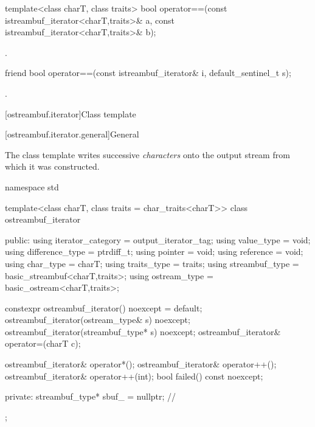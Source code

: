 %
\begin{itemdecl}
template<class charT, class traits>
  bool operator==(const istreambuf_iterator<charT,traits>& a,
                  const istreambuf_iterator<charT,traits>& b);
\end{itemdecl}

\begin{itemdescr}
\pnum
\returns
{}.
\end{itemdescr}

%
\begin{itemdecl}
friend bool operator==(const istreambuf_iterator& i, default_sentinel_t s);
\end{itemdecl}

\begin{itemdescr}
\pnum
\returns
{}.
\end{itemdescr}

[ostreambuf.iterator]{Class template }

[ostreambuf.iterator.general]{General}

\pnum
The class template 
writes successive \textit{characters} onto the output stream
from which it was constructed.

%
\begin{codeblock}
namespace std {
  template<class charT, class traits = char_traits<charT>>
  class ostreambuf_iterator {
  public:
    using iterator_category = output_iterator_tag;
    using value_type        = void;
    using difference_type   = ptrdiff_t;
    using pointer           = void;
    using reference         = void;
    using char_type         = charT;
    using traits_type       = traits;
    using streambuf_type    = basic_streambuf<charT,traits>;
    using ostream_type      = basic_ostream<charT,traits>;

    constexpr ostreambuf_iterator() noexcept = default;
    ostreambuf_iterator(ostream_type& s) noexcept;
    ostreambuf_iterator(streambuf_type* s) noexcept;
    ostreambuf_iterator& operator=(charT c);

    ostreambuf_iterator& operator*();
    ostreambuf_iterator& operator++();
    ostreambuf_iterator& operator++(int);
    bool failed() const noexcept;

  private:
    streambuf_type* sbuf_ = nullptr;    // \expos
  };
}
\end{codeblock}

